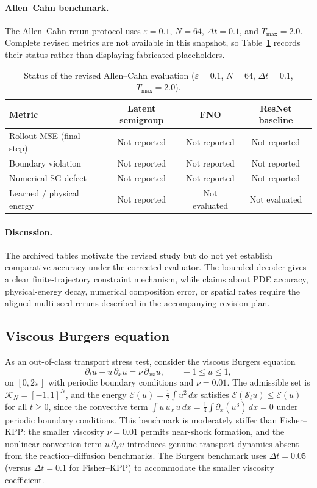 \documentclass[hidelinks,review,nohypdvips,onefignum,onetabnum]{siamart220329}
\newcommand{\cS}{\mathcal{S}}
\newcommand{\cK}{\mathcal{K}}
\newcommand{\cE}{\mathcal{E}}
\begin{document}
\paragraph{Allen--Cahn benchmark.}
The Allen--Cahn rerun protocol uses $\varepsilon=0.1$, $N=64$, $\Delta t=0.1$, and $T_{\max}=2.0$. Complete revised metrics are not available in this snapshot, so Table~\ref{tab:allen-cahn-results} records their status rather than displaying fabricated placeholders.

\begin{table}[htbp]
\centering
\caption{Status of the revised Allen--Cahn evaluation ($\varepsilon=0.1$, $N=64$, $\Delta t=0.1$, $T_{\max}=2.0$).}
\label{tab:allen-cahn-results}
\begin{tabular}{lccc}
\hline
Metric & Latent semigroup & FNO & ResNet baseline \\
\hline
Rollout MSE (final step) & Not reported & Not reported & Not reported \\[2pt]
Boundary violation & Not reported & Not reported & Not reported \\[2pt]
Numerical SG defect & Not reported & Not reported & Not reported \\[2pt]
Learned / physical energy & Not reported & Not evaluated & Not evaluated \\
\hline
\end{tabular}
\end{table}

\paragraph{Discussion.}
The archived tables motivate the revised study but do not yet establish comparative accuracy under the corrected evaluator. The bounded decoder gives a clear finite-trajectory constraint mechanism, while claims about PDE accuracy, physical-energy decay, numerical composition error, or spatial rates require the aligned multi-seed reruns described in the accompanying revision plan.

\subsection{Viscous Burgers equation}\label{subsec:burgers}
As an out-of-class transport stress test, consider the viscous Burgers equation
\begin{equation}\label{eq:burgers-bench}
\partial_t u + u\,\partial_x u = \nu\,\partial_{xx} u, \qquad -1\le u\le 1,
\end{equation}
on $[0,2\pi]$ with periodic boundary conditions and $\nu=0.01$. The admissible set is $\cK_N=[-1,1]^N$, and the energy $\cE(u)=\frac{1}{2}\int u^2\,dx$ satisfies $\cE(\cS_t u)\le \cE(u)$ for all $t\ge 0$, since the convective term $\int u\,u_x\,u\,dx=\frac{1}{3}\int \partial_x(u^3)\,dx=0$ under periodic boundary conditions. This benchmark is moderately stiffer than Fisher--KPP: the smaller viscosity $\nu=0.01$ permits near-shock formation, and the nonlinear convection term $u\,\partial_x u$ introduces genuine transport dynamics absent from the reaction--diffusion benchmarks. The Burgers benchmark uses $\Delta t=0.05$ (versus $\Delta t=0.1$ for Fisher--KPP) to accommodate the smaller viscosity coefficient.
\end{document}
